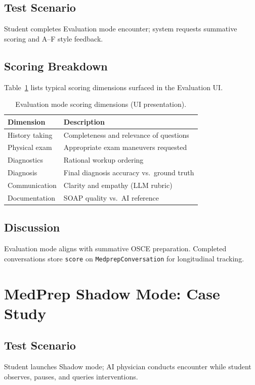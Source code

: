 \subsection{Test Scenario}
Student completes Evaluation mode encounter; system requests summative scoring and A--F style feedback.

\subsection{Scoring Breakdown}
Table~\ref{tab:eval-scoring} lists typical scoring dimensions surfaced in the Evaluation UI.

\begin{table}[htbp]
  \centering
  \caption{Evaluation mode scoring dimensions (UI presentation).}
  \label{tab:eval-scoring}
  \begin{tabular}{@{}lp{9cm}@{}}
    \toprule
    \textbf{Dimension} & \textbf{Description} \\
    \midrule
    History taking & Completeness and relevance of questions \\
    Physical exam & Appropriate exam maneuvers requested \\
    Diagnostics & Rational workup ordering \\
    Diagnosis & Final diagnosis accuracy vs.\ ground truth \\
    Communication & Clarity and empathy (LLM rubric) \\
    Documentation & SOAP quality vs.\ AI reference \\
    \bottomrule
  \end{tabular}
\end{table}

\subsection{Discussion}
Evaluation mode aligns with summative OSCE preparation. Completed conversations store \texttt{score} on \texttt{MedprepConversation} for longitudinal tracking.

\section{MedPrep Shadow Mode: Case Study}
\subsection{Test Scenario}
Student launches Shadow mode; AI physician conducts encounter while student observes, pauses, and queries interventions.


